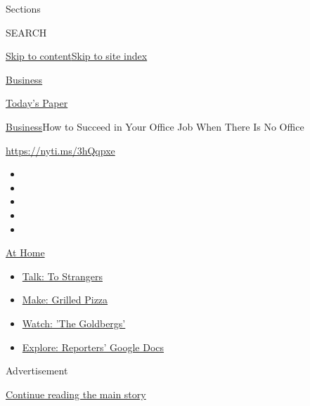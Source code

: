 Sections

SEARCH

\protect\hyperlink{site-content}{Skip to
content}\protect\hyperlink{site-index}{Skip to site index}

\href{https://www.nytimes.com/section/business}{Business}

\href{https://myaccount.nytimes.com/auth/login?response_type=cookie\&client_id=vi}{}

\href{https://www.nytimes.com/section/todayspaper}{Today's Paper}

\href{/section/business}{Business}\textbar{}How to Succeed in Your
Office Job When There Is No Office

\url{https://nyti.ms/3hQqpxe}

\begin{itemize}
\item
\item
\item
\item
\item
\end{itemize}

\href{https://www.nytimes.com/spotlight/at-home?action=click\&pgtype=Article\&state=default\&region=TOP_BANNER\&context=at_home_menu}{At
Home}

\begin{itemize}
\tightlist
\item
  \href{https://www.nytimes.com/2020/08/03/well/family/the-benefits-of-talking-to-strangers.html?action=click\&pgtype=Article\&state=default\&region=TOP_BANNER\&context=at_home_menu}{Talk:
  To Strangers}
\item
  \href{https://www.nytimes.com/2020/08/01/at-home/coronavirus-make-pizza-on-a-grill.html?action=click\&pgtype=Article\&state=default\&region=TOP_BANNER\&context=at_home_menu}{Make:
  Grilled Pizza}
\item
  \href{https://www.nytimes.com/2020/07/31/arts/television/goldbergs-abc-stream.html?action=click\&pgtype=Article\&state=default\&region=TOP_BANNER\&context=at_home_menu}{Watch:
  'The Goldbergs'}
\item
  \href{https://www.nytimes.com/interactive/2020/at-home/even-more-reporters-editors-diaries-lists-recommendations.html?action=click\&pgtype=Article\&state=default\&region=TOP_BANNER\&context=at_home_menu}{Explore:
  Reporters' Google Docs}
\end{itemize}

Advertisement

\protect\hyperlink{after-top}{Continue reading the main story}

